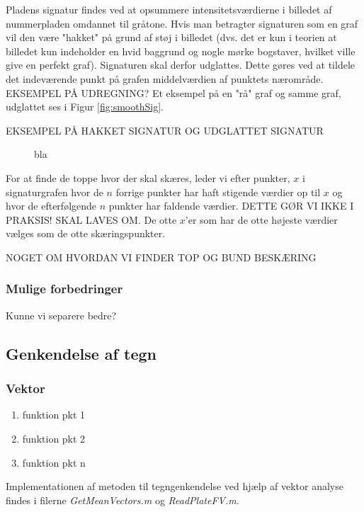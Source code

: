 Pladens signatur findes ved at opsummere intensitetsværdierne i billedet af nummerpladen omdannet til gråtone. Hvis man betragter signaturen som en graf vil den være "hakket" på grund af støj i billedet (dvs. det er kun i teorien at billedet kun indeholder en hvid baggrund og nogle mørke bogstaver, hvilket ville give en perfekt graf). Signaturen skal derfor udglattes. Dette gøres ved at tildele det indeværende punkt på grafen middelværdien af punktets nærområde. EKSEMPEL PÅ UDREGNING? Et eksempel på en "rå" graf og samme graf, udglattet ses i Figur \vref{fig:smoothSig}.

EKSEMPEL PÅ HAKKET SIGNATUR OG UDGLATTET SIGNATUR

\begin{figure}[htp]
\label{fig:smoothSig}
\caption{bla}
\end{figure}

For at finde de toppe hvor der skal skæres, leder vi efter punkter, $x$ i signaturgrafen hvor de $n$ forrige punkter har haft stigende værdier op til $x$ og hvor de efterfølgende $n$ punkter har faldende værdier. DETTE GØR VI IKKE I PRAKSIS! SKAL LAVES OM. De otte $x$'er som har de otte højeste værdier vælges som de otte skæringspunkter.

NOGET OM HVORDAN VI FINDER TOP OG BUND BESKÆRING


\subsubsection{Mulige forbedringer}
Kunne vi separere bedre?

\subsection{Genkendelse af tegn}

\subsubsection{Vektor}

\begin{enumerate}
\item funktion pkt 1
\item funktion pkt 2
\item funktion pkt n
\end{enumerate}

Implementationen af metoden til tegngenkendelse ved hjælp af vektor analyse findes i filerne \textit{GetMeanVectors.m} og \textit{ReadPlateFV.m}.

